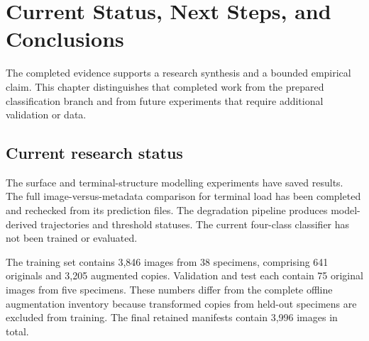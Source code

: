 \chapter{Current Status, Next Steps, and Conclusions}\label{ch:status}
The completed evidence supports a research synthesis and a bounded empirical claim. This chapter distinguishes that completed work from the prepared classification branch and from future experiments that require additional validation or data.

\section{Current research status}
The surface and terminal-structure modelling experiments have saved results. The full image-versus-metadata comparison for terminal load has been completed and rechecked from its prediction files. The degradation pipeline produces model-derived trajectories and threshold statuses. The current four-class classifier has not been trained or evaluated.

\begin{table}[htbp]\centering
\caption[Prepared four-class data splits]{Prepared four-class total-rust manifests. Counts come from the actual retained manifests, not the larger global augmentation inventory. All 48 specimens are assigned to disjoint splits; validation and test contain originals only. These are data-preparation counts and imply no classification performance.}\label{tab:classsplits}

\end{table}
The training set contains 3,846 images from 38 specimens, comprising 641 originals and 3,205 augmented copies. Validation and test each contain 75 original images from five specimens. These numbers differ from the complete offline augmentation inventory because transformed copies from held-out specimens are excluded from training. The final retained manifests contain 3,996 images in total.

